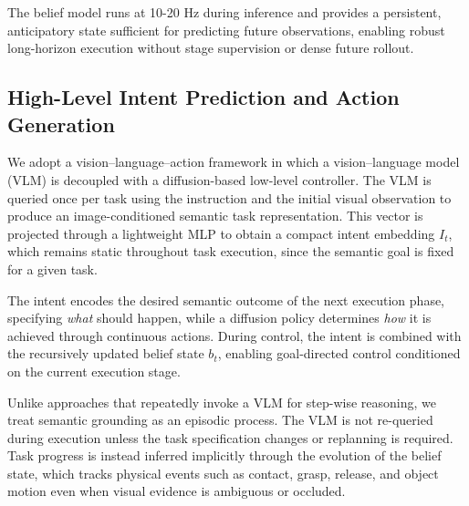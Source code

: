\documentclass[conference]{IEEEtran}
\begin{document}
The belief model runs at 10-20 Hz during inference and provides a persistent, anticipatory state sufficient for predicting future observations, enabling robust long-horizon execution without stage supervision or dense future rollout.


\subsection{High-Level Intent Prediction and Action Generation}
We adopt a vision–language–action framework in which a vision–language model (VLM) is decoupled with a diffusion-based low-level controller. The VLM is queried once per task using the instruction and the initial visual observation to produce an image-conditioned semantic task representation. This vector is projected through a lightweight MLP to obtain a compact intent embedding $I_t$, which remains static throughout task execution, since the semantic goal is fixed for a given task.

The intent encodes the desired semantic outcome of the next execution phase, specifying \emph{what} should happen, while a diffusion policy determines \emph{how} it is achieved through continuous actions. During control, the intent is combined with the recursively updated belief state $b_t$, enabling goal-directed control conditioned on the current execution stage.

Unlike approaches that repeatedly invoke a VLM for step-wise reasoning, we treat semantic grounding as an episodic process. The VLM is not re-queried during execution unless the task specification changes or replanning is required. Task progress is instead inferred implicitly through the evolution of the belief state, which tracks physical events such as contact, grasp, release, and object motion even when visual evidence is ambiguous or occluded.
\end{document}
